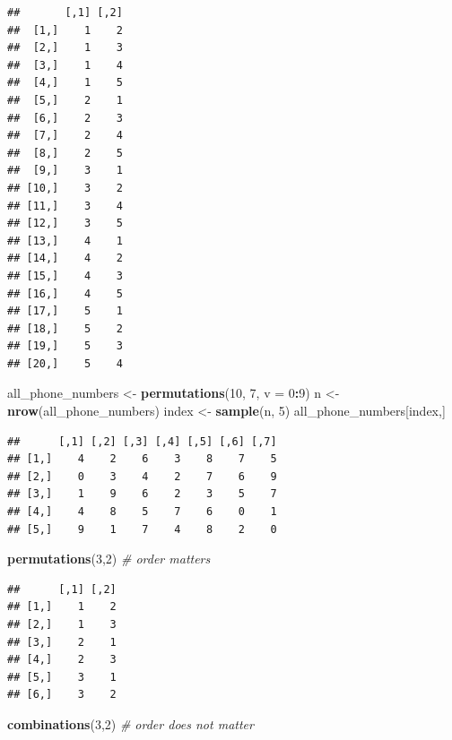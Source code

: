 \documentclass[
]{article}
\newenvironment{Shaded}{\begin{snugshade}}{\end{snugshade}}
\newcommand{\CommentTok}[1]{\textcolor[rgb]{0.56,0.35,0.01}{\textit{#1}}}
\newcommand{\DataTypeTok}[1]{\textcolor[rgb]{0.13,0.29,0.53}{#1}}
\newcommand{\DecValTok}[1]{\textcolor[rgb]{0.00,0.00,0.81}{#1}}
\newcommand{\KeywordTok}[1]{\textcolor[rgb]{0.13,0.29,0.53}{\textbf{#1}}}
\newcommand{\NormalTok}[1]{#1}
\newcommand{\OperatorTok}[1]{\textcolor[rgb]{0.81,0.36,0.00}{\textbf{#1}}}
\newcommand{\StringTok}[1]{\textcolor[rgb]{0.31,0.60,0.02}{#1}}
\begin{document}
\begin{verbatim}
##       [,1] [,2]
##  [1,]    1    2
##  [2,]    1    3
##  [3,]    1    4
##  [4,]    1    5
##  [5,]    2    1
##  [6,]    2    3
##  [7,]    2    4
##  [8,]    2    5
##  [9,]    3    1
## [10,]    3    2
## [11,]    3    4
## [12,]    3    5
## [13,]    4    1
## [14,]    4    2
## [15,]    4    3
## [16,]    4    5
## [17,]    5    1
## [18,]    5    2
## [19,]    5    3
## [20,]    5    4
\end{verbatim}

\begin{Shaded}
\begin{Highlighting}[]
\NormalTok{all\_phone\_numbers \textless{}{-}}\StringTok{ }\KeywordTok{permutations}\NormalTok{(}\DecValTok{10}\NormalTok{, }\DecValTok{7}\NormalTok{, }\DataTypeTok{v =} \DecValTok{0}\OperatorTok{:}\DecValTok{9}\NormalTok{)}
\NormalTok{n \textless{}{-}}\StringTok{ }\KeywordTok{nrow}\NormalTok{(all\_phone\_numbers)}
\NormalTok{index \textless{}{-}}\StringTok{ }\KeywordTok{sample}\NormalTok{(n, }\DecValTok{5}\NormalTok{)}
\NormalTok{all\_phone\_numbers[index,]}
\end{Highlighting}
\end{Shaded}

\begin{verbatim}
##      [,1] [,2] [,3] [,4] [,5] [,6] [,7]
## [1,]    4    2    6    3    8    7    5
## [2,]    0    3    4    2    7    6    9
## [3,]    1    9    6    2    3    5    7
## [4,]    4    8    5    7    6    0    1
## [5,]    9    1    7    4    8    2    0
\end{verbatim}

\begin{Shaded}
\begin{Highlighting}[]
\KeywordTok{permutations}\NormalTok{(}\DecValTok{3}\NormalTok{,}\DecValTok{2}\NormalTok{)    }\CommentTok{\# order matters}
\end{Highlighting}
\end{Shaded}

\begin{verbatim}
##      [,1] [,2]
## [1,]    1    2
## [2,]    1    3
## [3,]    2    1
## [4,]    2    3
## [5,]    3    1
## [6,]    3    2
\end{verbatim}

\begin{Shaded}
\begin{Highlighting}[]
\KeywordTok{combinations}\NormalTok{(}\DecValTok{3}\NormalTok{,}\DecValTok{2}\NormalTok{)    }\CommentTok{\# order does not matter}
\end{Highlighting}
\end{Shaded}
\end{document}
